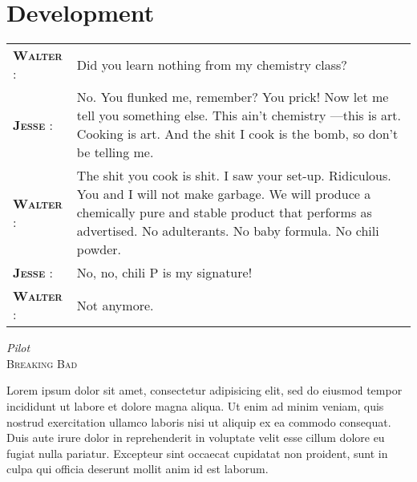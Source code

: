 \chapter{Development} %
\label{cha:development}

\setlength{\epigraphwidth}{10cm}
\renewcommand{\tabcolsep}{0em}

\epigraph{
  \begin{tabular}{p{1.75cm}p{8cm}}
    \footnotesize{\textbf{\textsc{Walter}} :}
      & Did you learn nothing from my chemistry class? \\
    \footnotesize{\textbf{\textsc{Jesse}} :}
      & No. You flunked me, remember? You prick! Now let me tell you something else. This ain't chemistry ---this is art. Cooking is art. And the shit I cook is the bomb, so don't be telling me. \\
    \footnotesize{\textbf{\textsc{Walter}} :}
      & The shit you cook is shit. I saw your set-up. Ridiculous. You and I will not make garbage. We will produce a chemically pure and stable product that performs as advertised. No adulterants. No baby formula. No chili powder. \\
    \footnotesize{\textbf{\textsc{Jesse}} :}
      & No, no, chili P is my signature! \\
    \footnotesize{\textbf{\textsc{Walter}} :}
      & Not anymore. \\
  \end{tabular}
  \vspace{1em}
}{\textit{Pilot}\\ \textsc{Breaking Bad}}

\newpage

Lorem ipsum dolor sit amet, consectetur adipisicing elit, sed do eiusmod tempor incididunt ut labore et dolore magna aliqua. Ut enim ad minim veniam, quis nostrud exercitation ullamco laboris nisi ut aliquip ex ea commodo consequat. Duis aute irure dolor in reprehenderit in voluptate velit esse cillum dolore eu fugiat nulla pariatur. Excepteur sint occaecat cupidatat non proident, sunt in culpa qui officia deserunt mollit anim id est laborum.


\nicesectionending

\nicesectionending

